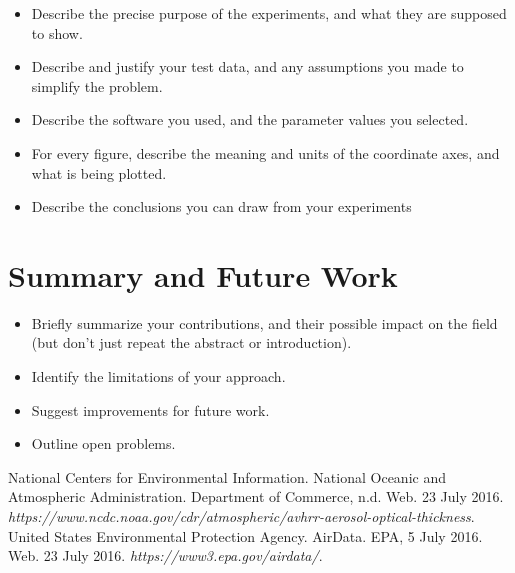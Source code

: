 \documentclass[10pt]{article}
\begin{document}
\begin{itemize}
\item Describe the precise purpose of the experiments, and what they 
are supposed to show.

\item Describe and justify your test data, and any assumptions you made to 
simplify the problem.

\item Describe the software you used, and the 
parameter values you selected.

\item 
For every figure, describe the meaning and units of the coordinate axes, 
and what is being plotted.

\item Describe the conclusions you can draw from your experiments
\end{itemize}

\section{Summary and Future Work}
\begin{itemize}
\item Briefly summarize your contributions, and their possible
impact on the field (but don't just repeat the abstract or introduction).
\item Identify the limitations of your approach.
\item Suggest improvements for future work.
\item Outline open problems.
\end{itemize}

\begin{thebibliography}{99}

 National Centers for Environmental Information. National Oceanic and Atmospheric Administration. Department of Commerce, n.d. Web. 23 July 2016. \textit{https://www.ncdc.noaa.gov/cdr/atmospheric/avhrr-aerosol-optical-thickness}.
 United States Environmental Protection Agency. AirData. EPA, 5 July 2016. Web. 23 July 2016. \textit{https://www3.epa.gov/airdata/}.


\end{thebibliography}
\end{document}
